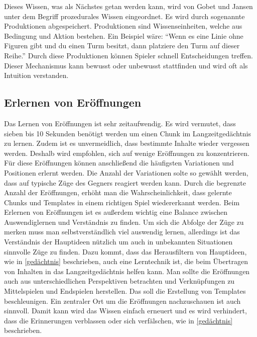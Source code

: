 Dieses Wissen, was als Nächstes getan werden kann, wird von Gobet und Jansen unter dem Begriff prozedurales Wissen eingeordnet. Es wird durch sogenannte Produktionen abgespeichert. Produktionen sind Wissenseinheiten, welche aus Bedingung und Aktion bestehen. Ein Beispiel wäre: \enquote{Wenn es eine Linie ohne Figuren gibt und du einen Turm besitzt, dann platziere den Turm auf dieser Reihe.} Durch diese Produktionen können Spieler schnell Entscheidungen treffen. Dieser Mechanismus kann bewusst oder unbewusst stattfinden und wird oft als Intuition verstanden.
\cite{gobet_training_2006}

\subsection{Erlernen von Eröffnungen}
Das Lernen von Eröffnungen ist sehr zeitaufwendig. Es wird vermutet, dass sieben bis 10 Sekunden benötigt werden um einen Chunk im Langzeitgedächtnis zu lernen. Zudem ist es unvermeidlich, dass bestimmte Inhalte wieder vergessen werden. Deshalb wird empfohlen, sich auf wenige Eröffnungen zu konzentrieren. Für diese Eröffnungen können anschließend die häufigsten Variationen und Positionen erlernt werden.
Die Anzahl der Variationen solte so gewählt werden, dass auf typische Züge des Gegners reagiert werden kann.
Durch die begrenzte Anzahl der Eröffnungen, erhöht man die Wahrscheinlichkeit, dass gelernte Chunks und Templates in einem richtigen Spiel wiedererkannt werden. Beim Erlernen von Eröffnungen ist es außerdem wichtig eine Balance zwischen Auswendiglernen und Verständnis zu finden. Um sich die Abfolge der Züge zu merken muss man selbstverständlich viel auswendig lernen, allerdings ist das Verständnis der Hauptideen nützlich um auch in unbekannten Situationen sinnvolle Züge zu finden. Dazu kommt, dass das Herausfiltern von Hauptideen, wie in \autoref{gedächtnis} beschrieben, auch eine Lerntechnik ist, die beim Übertragen von Inhalten in das Langzeitgedächtnis helfen kann. Man sollte die Eröffnungen auch aus unterschiedlichen Perspektiven betrachten und Verknüpfungen zu Mittelspielen und Endspielen herstellen. Das soll die Erstellung von Templates beschleunigen. Ein zentraler Ort um die Eröffnungen nachzuschauen ist auch sinnvoll. Damit kann wird das Wissen einfach erneuert und es wird verhindert, dass die Erinnerungen verblassen oder sich verfälschen, wie in \autoref{gedächtnis} beschrieben.
\cite{gobet_training_2006}

